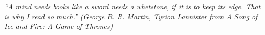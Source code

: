 \newpage
\begin{center}
\vspace*{\fill}
\hspace{.45\textwidth} %
    \begin{minipage}{.5\textwidth}
    \flushright
   \textit{``A mind needs books like a sword needs a whetstone, if it is to keep its edge. That is why I read so much.'' (George R. R. Martin, Tyrion Lannister from A Song of Ice and Fire: A Game of Thrones)}
    \end{minipage}
\end{center}